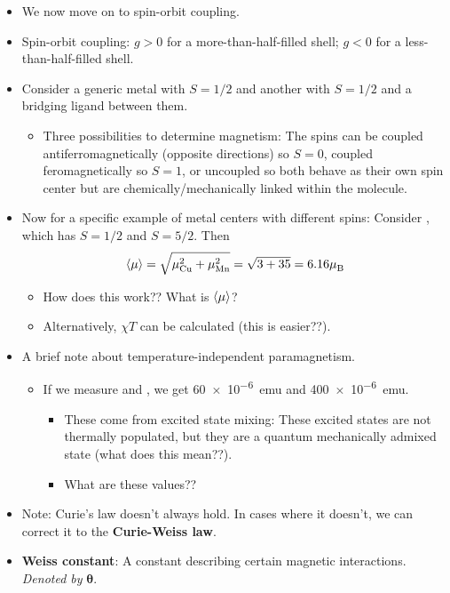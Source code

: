 \documentclass[../notes.tex]{subfiles}
\begin{document}
\begin{itemize}
    \item We now move on to spin-orbit coupling.
    \item Spin-orbit coupling: $g>0$ for a more-than-half-filled shell; $g<0$ for a less-than-half-filled shell.
    \item Consider a generic metal  with $S=1/2$ and another with $S=1/2$ and a bridging ligand  between them.
    \begin{itemize}
        \item Three possibilities to determine magnetism: The spins can be coupled antiferromagnetically (opposite directions) so $S=0$, coupled feromagnetically so $S=1$, or uncoupled so both behave as their own spin center but are chemically/mechanically linked within the molecule.
    \end{itemize}
    \item Now for a specific example of metal centers with different spins: Consider , which has $S=1/2$ and $S=5/2$. Then
    \begin{equation*}
        \prb{\mu} = \sqrt{\mu_{\ce{Cu}}^2+\mu_{\ce{Mn}}^2}
        = \sqrt{3+35}
        = 6.16\mB
    \end{equation*}
    \begin{itemize}
        \item How does this work?? What is $\left\langle{\mu}\right\rangle$?
        \item Alternatively, $\chi T$ can be calculated (this is easier??).
    \end{itemize}
    \item A brief note about temperature-independent paramagnetism.
    \begin{itemize}
        \item If we measure  and , we get \SI{60e-6}{emu} and \SI{400e-6}{emu}.
        \begin{itemize}
            \item These come from excited state mixing: These excited states are not thermally populated, but they are a quantum mechanically admixed state (what does this mean??).
            \item What are these values??
        \end{itemize}
    \end{itemize}
    \item Note: Curie's law doesn't always hold. In cases where it doesn't, we can correct it to the \textbf{Curie-Weiss law}.
    \item \textbf{Weiss constant}: A constant describing certain magnetic interactions. \emph{Denoted by} $\bm{\theta}$.

\end{itemize}
\end{document}
